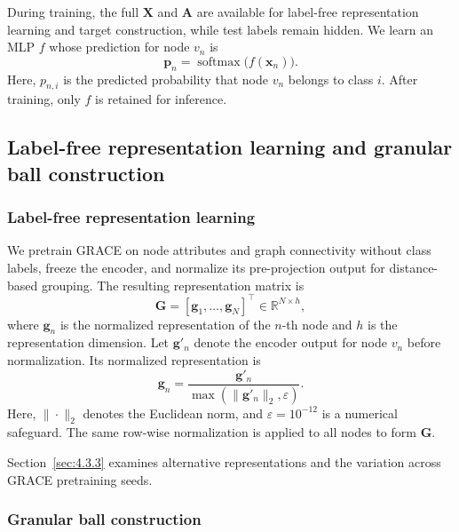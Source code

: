 \documentclass[times,review,10pt]{elsarticle}
\theoremstyle{definition}
\theoremstyle{plain}
\begin{document}

During training, the full \(\mathbf X\) and \(\mathbf A\) are available for label-free representation learning and target construction, while test labels remain hidden. We learn an MLP \(f\) whose prediction for node \(v_n\) is
\begin{equation}\label{eq:1}
\mathbf p_n=\operatorname{softmax}\bigl(f(\mathbf x_n)\bigr).
\end{equation}
Here, \(p_{n,i}\) is the predicted probability that node \(v_n\) belongs to class \(i\). After training, only \(f\) is retained for inference.

\subsection{Label-free representation learning and granular ball construction}\label{sec:3.2}

\subsubsection{Label-free representation learning}\label{sec:3.2.1}

We pretrain GRACE \cite{ref12} on node attributes and graph connectivity without class labels, freeze the encoder, and normalize its pre-projection output for distance-based grouping. The resulting representation matrix is
\begin{equation}\label{eq:2}
\mathbf G=[\mathbf g_1,\ldots,\mathbf g_N]^\top\in\mathbb R^{N\times h},
\end{equation}
where \(\mathbf g_n\) is the normalized representation of the \(n\)-th node and \(h\) is the representation dimension. Let \(\mathbf g'_n\) denote the encoder output for node \(v_n\) before normalization. Its normalized representation is
\begin{equation}\label{eq:3}
\mathbf g_n=\frac{\mathbf g'_n}{\max(\|\mathbf g'_n\|_2,\varepsilon)}.
\end{equation}
Here, \(\|\cdot\|_2\) denotes the Euclidean norm, and \(\varepsilon=10^{-12}\) is a numerical safeguard. The same row-wise normalization is applied to all nodes to form \(\mathbf G\).

Section~\ref{sec:4.3.3} examines alternative representations and the variation across GRACE pretraining seeds.

\subsubsection{Granular ball construction}\label{sec:3.2.2}
\end{document}
